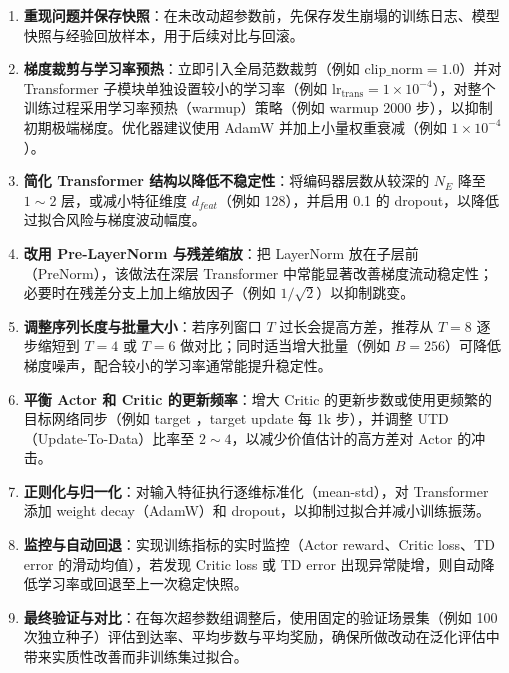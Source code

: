 \begin{enumerate}
    \item \textbf{重现问题并保存快照}：在未改动超参数前，先保存发生崩塌的训练日志、模型快照与经验回放样本，用于后续对比与回滚。

    \item \textbf{梯度裁剪与学习率预热}：立即引入全局范数裁剪（例如 $\text{clip\_norm}=1.0$）并对 Transformer 子模块单独设置较小的学习率（例如 $\mathrm{lr}_{\mathrm{trans}}=1\times10^{-4}$），对整个训练过程采用学习率预热（warmup）策略（例如 warmup 2000 步），以抑制初期极端梯度。优化器建议使用 AdamW 并加上小量权重衰减（例如 $1\times10^{-4}$）。

    \item \textbf{简化 Transformer 结构以降低不稳定性}：将编码器层数从较深的 $N_E$ 降至 $1\sim2$ 层，或减小特征维度 $d_{feat}$（例如 128），并启用 0.1 的 dropout，以降低过拟合风险与梯度波动幅度。

    \item \textbf{改用 Pre-LayerNorm 与残差缩放}：把 LayerNorm 放在子层前（PreNorm），该做法在深层 Transformer 中常能显著改善梯度流动稳定性；必要时在残差分支上加上缩放因子（例如 $1/\sqrt{2}$）以抑制跳变。

    \item \textbf{调整序列长度与批量大小}：若序列窗口 $T$ 过长会提高方差，推荐从 $T=8$ 逐步缩短到 $T=4$ 或 $T=6$ 做对比；同时适当增大批量（例如 $B=256$）可降低梯度噪声，配合较小的学习率通常能提升稳定性。

    \item \textbf{平衡 Actor 和 Critic 的更新频率}：增大 Critic 的更新步数或使用更频繁的目标网络同步（例如 target ，target update 每 1k 步），并调整 UTD（Update-To-Data）比率至 $2\sim4$，以减少价值估计的高方差对 Actor 的冲击。

    \item \textbf{正则化与归一化}：对输入特征执行逐维标准化（mean-std），对 Transformer 添加 weight decay（AdamW）和 dropout，以抑制过拟合并减小训练振荡。

    \item \textbf{监控与自动回退}：实现训练指标的实时监控（Actor reward、Critic loss、TD error 的滑动均值），若发现 Critic loss 或 TD error 出现异常陡增，则自动降低学习率或回退至上一次稳定快照。

    \item \textbf{最终验证与对比}：在每次超参数组调整后，使用固定的验证场景集（例如 100 次独立种子）评估到达率、平均步数与平均奖励，确保所做改动在泛化评估中带来实质性改善而非训练集过拟合。
\end{enumerate}

